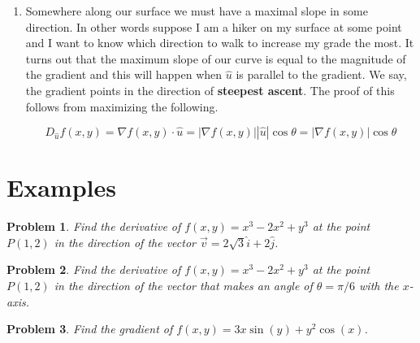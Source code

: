 \documentclass[11pt]{article}
\newtheorem{problem}{Problem}
\begin{document}
\begin{enumerate}
or in terms of our gradient,

\begin{equation*}
    D_{\hat{u}} f(x,y,z) = \nabla f(x,y,z) \cdot \hat{u}
\end{equation*}


\item Somewhere along our surface we must have a maximal slope in some direction. In other words suppose I am a hiker on my surface at some point and I want to know which direction to walk to increase my grade the most. It turns out that the maximum slope of our curve is equal to the magnitude of the gradient and this will happen when $\hat{u}$ is parallel to the gradient. We say, the gradient points in the direction of \textbf{steepest ascent}. The proof of this follows from maximizing the following.

\begin{equation*}
    D_{\hat{u}}f(x,y) = \nabla f(x,y) \cdot \hat{u} = |\nabla f(x,y)||\hat{u}|\cos{\theta} = |\nabla f(x,y)|\cos{\theta} 
\end{equation*}

\end{enumerate}





\newpage

\section{Examples}

\begin{problem}
    Find the derivative of $f(x,y)=x^3-2x^2+y^3$ at the point $P(1,2)$ in the direction of the vector $\vec{v}= 2\sqrt{3}\hat{i} + 2\hat{j}$.
\end{problem}

\vspace{6cm}


\begin{problem}
        Find the derivative of $f(x,y)=x^3-2x^2+y^3$ at the point $P(1,2)$ in the direction of the vector that makes an angle of $\theta = \pi/6$ with the $x$-axis.
\end{problem}


\vspace{6cm}


\begin{problem}
    Find the gradient of $f(x,y) = 3x\sin(y) + y^2\cos(x)$.
\end{problem}
\end{document}

